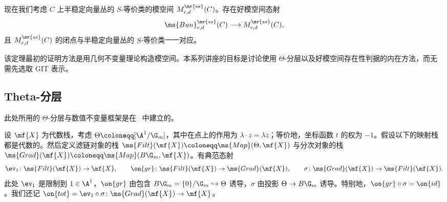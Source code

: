 现在我们考虑 \(C\) 上半稳定向量丛的 \(S\)-等价类的模空间 \(M_{r,d}^{\mr{ss}}(C)\)。存在好模空间态射
\[
    \ms{Bun}_{r,d}^{\mr{ss}}(C)\longrightarrow M_{r,d}^{\mr{ss}}(C),
\]
且 \(M_{r,d}^{\mr{ss}}(C)\) 的闭点与半稳定向量丛的 \(S\)-等价类一一对应。

\begin{rmk}
    该定理最初的证明方法是用几何不变量理论构造模空间。本系列讲座的目标是讨论使用 \(\Theta\)-分层以及好模空间存在性判据的内在方法，而无需先选取 GIT 表示。
\end{rmk}


\subsection{Theta-分层}%
\label{sub:Theta-stratifications}

此处所用的 \(\Theta\)-分层与数值不变量框架是在~\cite{HLinstability} 中建立的。

设 \(\mf{X}\) 为代数栈，考虑 \(\Theta\coloneqq[\A^1/\G_m]\)，其中在点上的作用为 \(\lambda\cdot z=\lambda z\)；等价地，坐标函数 \(t\) 的权为 \(-1\)。假设以下的映射栈都是代数的。然后定义滤链对象的栈 \(\ms{Filt}(\mf{X})\coloneqq\ms{Map}(\Theta,\mf{X})\) 与分次对象的栈 \(\ms{Grad}(\mf{X})\coloneqq\ms{Map}(B\G_m,\mf{X})\)。有典范态射
\[
    \ev_1\colon\ms{Filt}(\mf{X})\to\mf{X},
    \qquad
    \on{gr}\colon\ms{Filt}(\mf{X})\to\ms{Grad}(\mf{X}),
    \qquad
    \sigma\colon\ms{Grad}(\mf{X})\to\ms{Filt}(\mf{X}).
\]
此处 \(\ev_1\) 是限制到 \(1\in\A^1\)，\(\on{gr}\) 由包含 \(B\G_m=\{0\}/\G_m\hookrightarrow\Theta\) 诱导，\(\sigma\) 由投影 \(\Theta\to B\G_m\) 诱导。特别地，\(\on{gr}\circ\sigma=\on{id}\)。我们还记 \(\on{tot}=\ev_1\circ\sigma\colon\ms{Grad}(\mf{X})\to\mf{X}\)。

